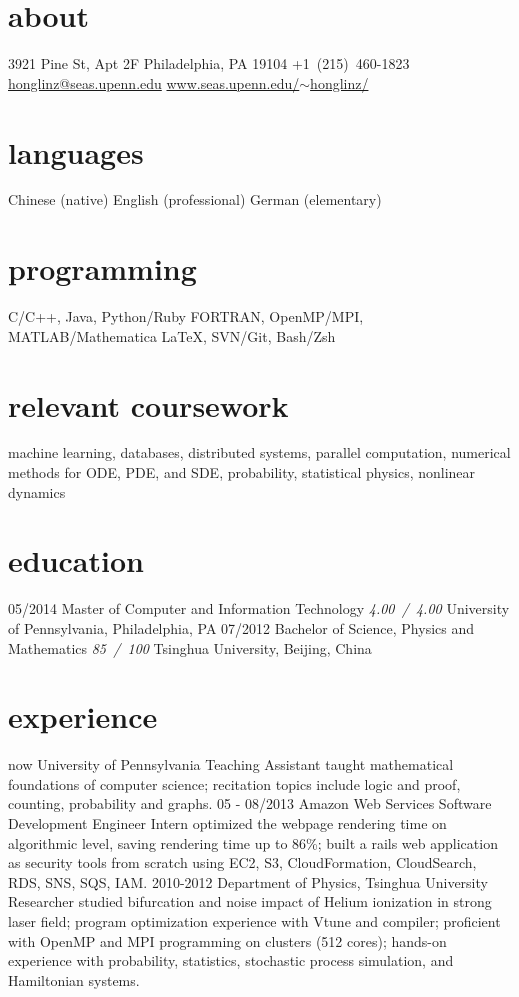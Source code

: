 \documentclass[]{friggeri-cv}
\begin{document}
{}

\begin{aside}
  \section{about}
  3921 Pine St, Apt 2F
  Philadelphia, PA
  19104
  +1~(215)~460-1823
  \href{mailto:honglinz@seas.upenn.edu}{honglinz@seas.upenn.edu}
  \href{http://www.seas.upenn.edu/~honglinz/}{www.seas.upenn.edu/$\sim$honglinz/}
  \section{languages}
  Chinese (native)
  English (professional)
  German (elementary)
  \section{programming}
  C/C++, Java, Python/Ruby
  FORTRAN, OpenMP/MPI, MATLAB/Mathematica
  \LaTeX, SVN/Git, Bash/Zsh
\end{aside}

\section{relevant coursework}
machine learning, databases, distributed systems, parallel computation, numerical methods for ODE, PDE, and SDE, probability, statistical physics, nonlinear dynamics
\section{education}

\begin{entrylist}
  \entry
    {05/2014}
    {Master of Computer and Information Technology}
    {\emph{4.00~/~4.00}}
    {University of Pennsylvania, Philadelphia, PA}
  \entry
    {07/2012}
    {Bachelor of Science, Physics and Mathematics}
    {\emph{85~/~100}}
    {Tsinghua University, Beijing, China}
\end{entrylist}
\section{experience}
\begin{entrylist}
  \entry
  {now}
  {University of Pennsylvania}
  {Teaching Assistant}
  {taught mathematical foundations of computer science; recitation topics include logic and proof, counting, probability and graphs.}
  \entry
  {05 - 08/2013}
  {Amazon Web Services}
  {Software Development Engineer Intern}
  {optimized the webpage rendering time on algorithmic level, saving rendering time up to 86\%; built a rails web application as security tools from scratch using EC2, S3, CloudFormation, CloudSearch, RDS, SNS, SQS, IAM.}
  \entry
  {2010-2012}
  {Department of Physics, Tsinghua University}
  {Researcher}
  {studied bifurcation and noise impact of Helium ionization in strong laser field; program optimization experience with Vtune and compiler; proficient with OpenMP and MPI programming on clusters (512 cores); hands-on experience with probability, statistics, stochastic process simulation, and Hamiltonian systems.}
\end{entrylist}
\end{document}
